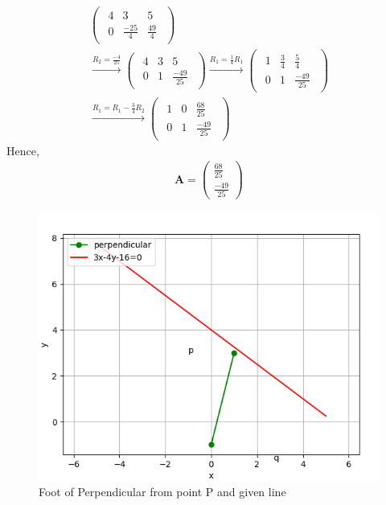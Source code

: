 \documentclass[12pt]{article}
\let\vec\mathbf
\newcommand{\myvec}[1]{\ensuremath{\begin{pmatrix}#1\end{pmatrix}}}
\let\vec\mathbf
\begin{document}
\begin{enumerate}
\begin{align}
  \begin{pmatrix}
  \begin{array}{rr|r}
  4 & 3 & 5\\
  0 & \frac{-25}{4} & \frac{49}{4}
  \end{array}
  \end{pmatrix}\\\xrightarrow[]{R_2=\frac{-4}{25}}
  \begin{pmatrix}
  \begin{array}{rr|r}
  4 & 3 & 5\\
  0 & 1 & \frac{-49}{25}
  \end{array}
  \end{pmatrix}\xrightarrow[]{R_1=\frac{1}{4}R_1}
  \begin{pmatrix}
  \begin{array}{rr|r}
  1 & \frac{3}{4} & \frac{5}{4}\\
  0 & 1 & \frac{-49}{25}
  \end{array}
  \end{pmatrix}\\\xrightarrow[]{R_1=R_1-\frac{3}{4}R_2}
  \begin{pmatrix}
  \begin{array}{rr|r}
  1 & 0 & \frac{68}{25}\\
  0 & 1 & \frac{-49}{25}  
  \end{array}
  \end{pmatrix}        
\end{align}
Hence,
\begin{align}
\vec{A}=\myvec{\frac{68}{25}\\\frac{-49}{25}}
\end{align}
\begin{figure}[!h]
	\begin{center} 
	    \includegraphics[width=\columnwidth]{figs/lines.png}
	\end{center}
\caption{Foot of Perpendicular from point P and given line}
\label{fig:Fig}
\end{figure}
\end{enumerate}
\end{document}
